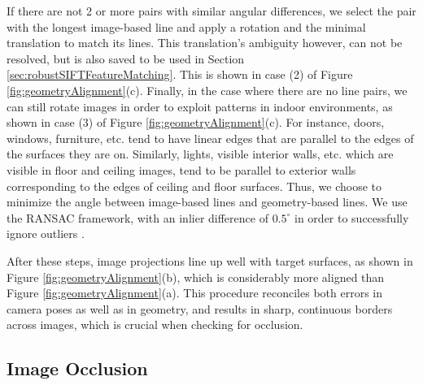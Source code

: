 \documentclass[]{spie}  %
\begin{document}
If there are not 2 or more pairs with similar angular differences, we
select the pair with the longest image-based line and apply a rotation
and the minimal translation to match its lines. This translation's
ambiguity however, can not be resolved, but is also saved to be used
in Section \ref{sec:robustSIFTFeatureMatching}. This is shown in case
(2) of Figure \ref{fig:geometryAlignment}(c). Finally, in the case
where there are no line pairs, we can still rotate images in order to
exploit patterns in indoor environments, as shown in case (3) of
Figure \ref{fig:geometryAlignment}(c). For instance, doors, windows,
furniture, etc. tend to have linear edges that are parallel to the
edges of the surfaces they are on. Similarly, lights, visible interior
walls, etc. which are visible in floor and ceiling images, tend to be
parallel to exterior walls corresponding to the edges of ceiling and
floor surfaces. Thus, we choose to minimize the angle between
image-based lines and geometry-based lines. We use the RANSAC
framework, with an inlier difference of $0.5^\circ$ in order to
successfully ignore outliers \cite{fischler1981random}.

After these steps, image projections line up well with target
surfaces, as shown in Figure \ref{fig:geometryAlignment}(b), which is
considerably more aligned than Figure
\ref{fig:geometryAlignment}(a). This procedure reconciles both errors
in camera poses as well as in geometry, and results in sharp,
continuous borders across images, which is crucial when checking for
occlusion.


\subsection{Image Occlusion}
\label{sec:imageOcclusion}
\end{document}
